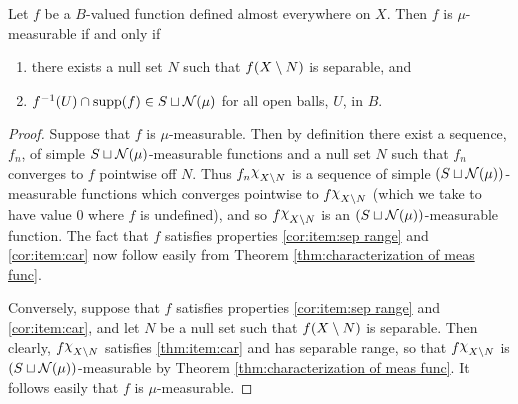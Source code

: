 \begin{corollary}
\label{cor:characterization of meas func}
Let $f$ be a $B$-valued function defined almost everywhere on $X$. Then $f$ is $\mu$-measurable if and only if
\begin{enumerate}[label=\arabic*),ref=\arabic*)]
    \item \label{cor:item:sep range}
    there exists a null set $N$ such that $f(X\setminus N)$ is separable, and
    \item \label{cor:item:car}
    $f^{-1}(U) \cap \operatorname{supp}(f) \in S \sqcup {\cal N}(\mu)$ for all open balls, $U$, in $B$.
\end{enumerate}
\end{corollary}
\begin{proof}
Suppose that $f$ is $\mu$-measurable. Then by definition there exist a sequence, $f_n$, of simple $S\sqcup {\cal N}(\mu)$-measurable functions and a null set $N$ such that $f_n$ converges to $f$ pointwise off $N$. Thus $f_n\idf{X\sd N}$ is a sequence of simple $(S \sqcup {\cal N}(\mu))$-measurable functions which converges pointwise to $f\idf{X\sd N}$ (which we take to have value 0 where $f$ is undefined), and so $f\idf{X\sd N}$ is an $(S\sqcup{\cal N}(\mu))$-measurable function. The fact that $f$ satisfies properties \ref{cor:item:sep range} and \ref{cor:item:car} now follow easily from Theorem \ref{thm:characterization of meas func}.

Conversely, suppose that $f$ satisfies properties \ref{cor:item:sep range} and \ref{cor:item:car}, and let $N$ be a null set such that $f(X\setminus N)$ is separable. Then clearly, $f\idf{X\sd N}$ satisfies \ref{thm:item:car} and has separable range, so that $f\idf{X\sd N}$ is $(S\sqcup{\cal N}(\mu))$-measurable by Theorem \ref{thm:characterization of meas func}. It follows easily that $f$ is $\mu$-measurable.
\end{proof}


